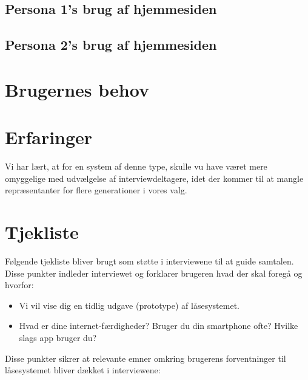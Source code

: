\documentclass[a4paper,12pt]{article}
\begin{document}
\subsection{Persona 1's brug af hjemmesiden}
\subsection{Persona 2's brug af hjemmesiden}

\section{Brugernes behov}

\section{Erfaringer}

Vi har lært, at for en system af denne type, skulle vu have været mere omyggelige med udvælgelse af interviewdeltagere, idet der kommer til at mangle repræsentanter for flere generationer i vores valg.

\newpage 
\appendix
\section{Tjekliste}
Følgende tjekliste bliver brugt som støtte i interviewene til at guide samtalen. \\
Disse punkter indleder interviewet og forklarer brugeren hvad der skal foregå og hvorfor:

\begin{itemize}
    \item Vi vil vise dig en tidlig udgave (prototype) af låsesystemet.
    \item Hvad er dine internet-færdigheder? Bruger du din smartphone ofte? Hvilke slags app bruger du?
\end{itemize}

Disse punkter sikrer at relevante emner omkring brugerens forventninger til låsesystemet bliver dækket i interviewene:
\end{document}
